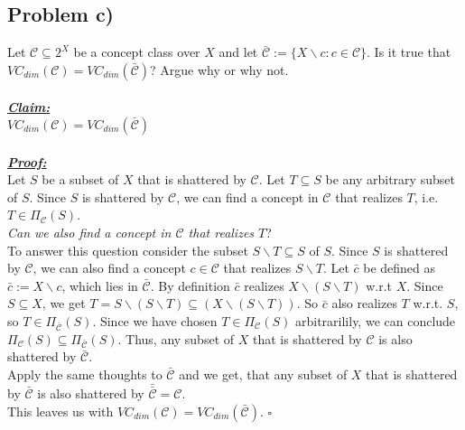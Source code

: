 \subsection*{Problem c)}
Let $\mathcal{C} \subseteq 2^X$ be a concept class over $X$ and let $\bar{\mathcal{C}} := \{X \backslash c : c \in \mathcal{C}\}$. Is it
true that $VC_{dim}(\mathcal{C}) = VC_{dim}(\bar{\mathcal{C}})$? Argue why or why not.\\
\\
\textbf{\underline{\textit{Claim:}}}\\
$VC_{dim}(\mathcal{C}) = VC_{dim}(\bar{\mathcal{C}})$\\
\\
\textbf{\underline{\textit{Proof:}}}\\
Let $S$ be a subset of $X$ that is shattered by $\mathcal{C}$.
Let $T \subseteq S$ be any arbitrary subset of $S$.
Since $S$ is shattered by $\mathcal{C}$, we can find a concept in $\mathcal{C}$ that realizes $T$, i.e. $T\in\Pi _{\mathcal{C}}(S)$.\\
\textit{Can we also find a concept in $\mathcal{C}$ that realizes $T$}?\\
To answer this question consider the subset $S\backslash T \subseteq S$ of $S$. Since $S$ is shattered by  $\mathcal{C}$, we can also find a concept $c \in\mathcal{C}$ that realizes $S\backslash T$.
Let $\bar{c}$ be defined as $\bar{c}:= X\backslash c$, which lies in $\bar{\mathcal{C}}$. By definition $\bar{c}$ realizes $X\backslash (S\backslash T)$ w.r.t $X$.
Since $S \subseteq X$, we get $T = S\backslash (S\backslash T) \subseteq (X\backslash (S\backslash T))$. So $\bar{c}$ also realizes $T$ w.r.t. $S$, so $T\in\Pi _{\bar{\mathcal{C}}}(S)$.
Since we have chosen $T\in\Pi _{\mathcal{C}}(S)$ arbitrarilily, we can conclude $\Pi _{\mathcal{C}}(S) \subseteq \Pi  _{\bar{\mathcal{C}}}(S)$.
Thus, any subset of $X$ that is shattered by $\mathcal{C}$ is also shattered by $\bar{\mathcal{C}}$.\\
Apply the same thoughts to $\bar{\mathcal{C}}$ and we get, that any subset of $X$ that is shattered by $\bar{\mathcal{C}}$ is also shattered by $\bar{\bar{\mathcal{C}}} = \mathcal{C}$.\\ 
This leaves us with $VC_{dim}(\mathcal{C}) = VC_{dim}(\bar{\mathcal{C}})$.
\hfill$\square$

